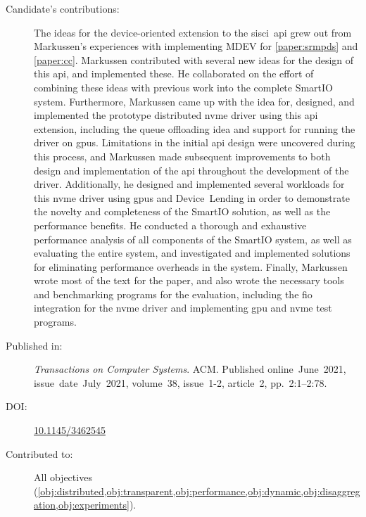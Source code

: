 \begin{description}
	\item[Candidate's contributions:]
		The ideas for the device-oriented extension to the \gls{sisci}~\gls{api} grew out from Markussen's experiences with implementing MDEV for \cref{paper:srmpds} and \cref{paper:cc}.
		Markussen contributed with several new ideas for the design of this \gls{api}, and implemented these.
		He collaborated on the effort of combining these ideas with previous work into the complete SmartIO system. 
		Furthermore, Markussen came up with the idea for, designed, and implemented the prototype distributed \gls{nvme} driver using this \gls{api} extension, 
		including the queue offloading idea and support for running the driver on \glspl{gpu}.
		Limitations in the initial \gls{api} design were uncovered during this process, and Markussen made subsequent improvements to both design and implementation of the \gls{api} throughout the development of the driver.
		Additionally, he designed and implemented several workloads for this \gls{nvme} driver using \glspl{gpu} and Device~Lending
		in order to demonstrate the novelty and completeness of the SmartIO solution, as well as the performance benefits.
		He conducted a thorough and exhaustive performance analysis of all components of the SmartIO system,
		as well as evaluating the entire system, and investigated and implemented solutions for eliminating performance overheads in the system.
		Finally, Markussen wrote most of the text for the paper, and also wrote the necessary tools and benchmarking programs for the evaluation,
		including the \gls{fio} integration for the \gls{nvme} driver and implementing \gls{gpu} and \gls{nvme} test programs.
		

	\item[Published in:]
		\emph{Transactions on Computer Systems}. ACM.
		Published online~June~2021,
		issue~date~July~2021, 
		volume~38, issue~1-2, article~2, pp.~2:1--2:78.

	\item[DOI:] \href{https://doi.org/10.1145/3462545}{10.1145/3462545}

	\item[Contributed to:]
        All objectives (\cref{obj:distributed,obj:transparent,obj:performance,obj:dynamic,obj:disaggregation,obj:experiments}).

\end{description}

